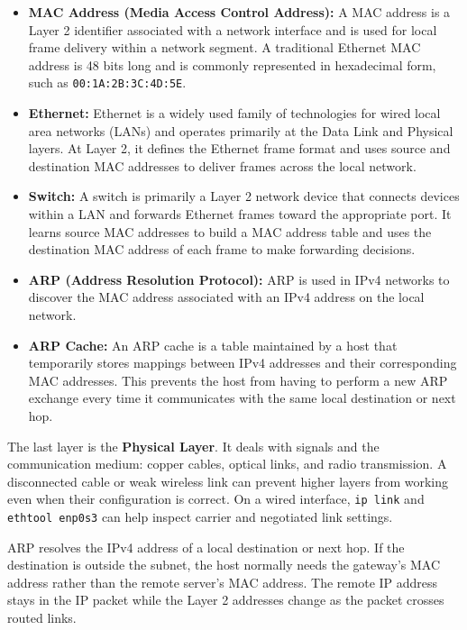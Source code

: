 \documentclass[journal]{IEEEtran}
\begin{document}
\begin{itemize}
    \item \textbf{MAC Address (Media Access Control Address):} A MAC address is a Layer 2 identifier associated with a network interface and is used for local frame delivery within a network segment. A traditional Ethernet MAC address is 48 bits long and is commonly represented in hexadecimal form, such as \texttt{00:1A:2B:3C:4D:5E}.

    \item \textbf{Ethernet:} Ethernet is a widely used family of technologies for wired local area networks (LANs) and operates primarily at the Data Link and Physical layers. At Layer 2, it defines the Ethernet frame format and uses source and destination MAC addresses to deliver frames across the local network.

    \item \textbf{Switch:} A switch is primarily a Layer 2 network device that connects devices within a LAN and forwards Ethernet frames toward the appropriate port. It learns source MAC addresses to build a MAC address table and uses the destination MAC address of each frame to make forwarding decisions.

    \item \textbf{ARP (Address Resolution Protocol):} ARP is used in IPv4 networks to discover the MAC address associated with an IPv4 address on the local network.

    \item \textbf{ARP Cache:} An ARP cache is a table maintained by a host that temporarily stores mappings between IPv4 addresses and their corresponding MAC addresses. This prevents the host from having to perform a new ARP exchange every time it communicates with the same local destination or next hop.
\end{itemize}


The last layer is the \textbf{Physical Layer}. It deals with signals and the communication medium: copper cables, optical links, and radio transmission. A disconnected cable or weak wireless link can prevent higher layers from working even when their configuration is correct. On a wired interface, \texttt{ip link} and \texttt{ethtool enp0s3} can help inspect carrier and negotiated link settings.

ARP resolves the IPv4 address of a local destination or next hop. If the destination is outside the subnet, the host normally needs the gateway's MAC address rather than the remote server's MAC address. The remote IP address stays in the IP packet while the Layer 2 addresses change as the packet crosses routed links.
\end{document}
